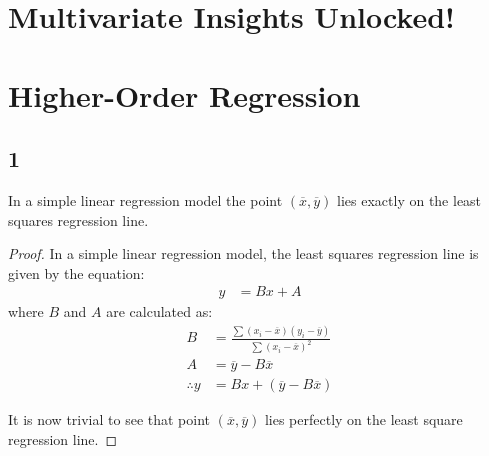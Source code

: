 \section{Multivariate Insights Unlocked!}

\section{Higher-Order Regression}

\subsection{1}
\begin{claim}
    In a simple linear regression model the point \((\overline{x},\overline{y})\) lies exactly on the least squares regression line.
\end{claim}
\begin{proof}
In a simple linear regression model, the least squares regression line is given by the equation:
\begin{align*}
    y &= Bx + A
\end{align*}
where \(B\) and \(A\) are calculated as:
\begin{align}
    B&=\frac{\sum(x_i-\overline{x})(y_i-\overline{y})}{\sum(x_i - \overline{x})^2}\\
    A&= \overline{y} - B\overline{x}\\
    \therefore y &= Bx + ( \overline{y} - B\overline{x} )
\end{align}

It is now trivial to see that point \((\overline{x},\overline{y})\) lies perfectly on the least square regression line.
\end{proof}

